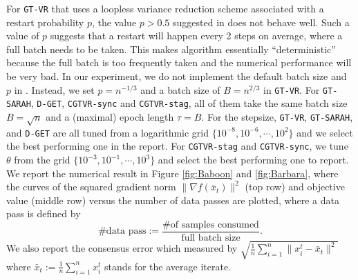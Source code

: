 \documentclass{article}
\begin{document}
\vspace{0.25cm} 


For \texttt{GT-VR} that uses a loopless variance reduction scheme associated with a restart probability $p$, the value $p>0.5$ suggested in \cite[Corollary IV.1]{jiang2022distributed} does not behave well. Such a value of $p$ suggests that a restart will happen every 2 steps on average, where a full batch needs to be taken. This makes algorithm essentially ``deterministic'' because the full batch is too frequently taken and the numerical performance will be very bad. In our experiment, we do not implement the default batch size and $p$ in \cite{jiang2022distributed}. Instead, we set $p= n^{-1/3}$ and a batch size of $B=n^{2/3}$ in \texttt{GT-VR}. For \texttt{GT-SARAH}, \texttt{D-GET}, \texttt{CGTVR-sync} and \texttt{CGTVR-stag}, all of them take the same batch size $B=\sqrt{n}$ and a (maximal) epoch length $\tau = B$. For the stepsize, \texttt{GT-VR}, \texttt{GT-SARAH}, and \texttt{D-GET}  are all tuned from a logarithmic grid $\{10^{-8},10^{-6},\cdots,10^{2}\}$ and we select the best performing one in the report. For \texttt{CGTVR-stag} and \texttt{CGTVR-sync}, we tune $\theta$ from the grid $\{10^{-3},10^{-1},\cdots,10^{3}\}$ and select the best performing one to report.  We report the numerical result in Figure \ref{fig:Baboon} and \ref{fig:Barbara}, where the curves of the squared gradient norm $\|\nabla f(\bar{x}_t)\|^2$ (top row) and objective value (middle row) versus the number of data passes are plotted, where a data pass is defined by 
$$\text{\# data pass}:=\frac{\text{\# of samples consumed}}{\text{full batch size}}.$$ 
We also report the consensus error which measured by $\sqrt{\frac{1}{n}\sum_{i=1}^n \|x_i^t-\bar{x}_t\|^2}$ where $
\bar{x}_t:=\frac{1}{n}\sum_{i=1}^n x_i^t$ stands for the average iterate.
\end{document}
